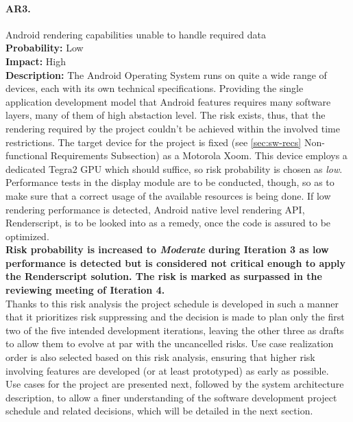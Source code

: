 		\paragraph{AR3.}Android rendering capabilities unable to handle required data\\
		\textbf{Probability:} Low\\
		\textbf{Impact:} High\\
		\textbf{Description:} The Android Operating System runs on quite a wide range of devices, each with its own technical specifications. Providing the single application development model that Android features requires many software layers, many of them of high abstaction level. The risk exists, thus, that the rendering required by the project couldn't be achieved within the involved time restrictions. The target device for the project is fixed (see \autoref{sec:sw-recs} Non-functional Requirements Subsection) as a Motorola Xoom. This device employs a dedicated Tegra2 GPU \cite{xoomspecs} which should suffice, so risk probability is chosen as \emph{low}. Performance tests in the display module are to be conducted, though, so as to make sure that a correct usage of the available resources is being done. 
		If low rendering performance is detected, Android native level rendering API, Renderscript, is to be looked into as a remedy, once the code is assured to be optimized.
		\\
		\textbf{Risk probability is increased to \emph{Moderate} during Iteration 3 as low performance is detected but is considered not critical enough to apply the Renderscript solution. The risk is marked as surpassed in the reviewing meeting of Iteration 4.}\\

		Thanks to this risk analysis the project schedule is developed in such a manner that it prioritizes risk suppressing and the decision is made to plan only the first two of the five intended development iterations, leaving the other three as drafts to allow them to evolve at par with the uncancelled risks.
		Use case realization order is also selected based on this risk analysis, ensuring that higher risk involving features are developed (or at least prototyped) as early as possible.\\
		
		Use cases for the project are presented next, followed by the system architecture description, to allow a finer understanding of the software development project schedule and related decisions, which will be detailed in the next section.
	
